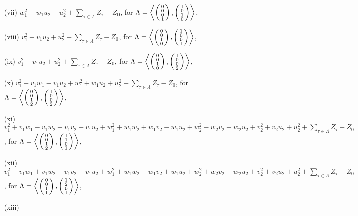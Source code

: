 \begin{prop}
\begin{itemize}
\item[(vii)]
$w_1^2-w_1u_2+u_2^2+\sum_{\tau\in \Lambda} Z_\tau-Z_0$, for $\Lambda= \plan{0\\0\\0\\1}{1\\0\\1\\0}$,
\item[(viii)]
$v_1^2+v_1u_2+u_2^2+\sum_{\tau\in \Lambda} Z_\tau-Z_0$, for $\Lambda= \plan{0\\0\\1\\0}{1\\0\\0\\1}$,
\item[(ix)]
$v_1^2-v_1u_2+u_2^2+\sum_{\tau\in \Lambda} Z_\tau-Z_0$, for $\Lambda= \plan{0\\0\\1\\0}{1\\0\\0\\2}$,
\item[(x)]
$v_1^2+v_1w_1-v_1u_2+w_1^2+w_1u_2+u_2^2+\sum_{\tau\in \Lambda} Z_\tau-Z_0$, for $\Lambda = \plan{0\\0\\1\\2}{1\\0\\0\\2}$,
\item[(xi)]
$v_1^2+v_1w_1-v_1w_2-v_1v_2+v_1u_2+w_1^2+w_1w_2+w_1v_2-w_1u_2+w_2^2-w_2v_2+w_2u_2+v_2^2+v_2u_2+u_2^2+\sum_{\tau\in \Lambda} Z_\tau-Z_0$, for $\Lambda = \plan{0\\0\\1\\2}{1\\1\\0\\1}$,
\item[(xii)]
$v_1^2-v_1w_1+v_1w_2-v_1v_2+v_1u_2+w_1^2+w_1w_2-w_1v_2+w_1u_2+w_2^2+w_2v_2-w_2u_2+v_2^2+v_2u_2+u_2^2+\sum_{\tau\in \Lambda} Z_\tau-Z_0$, for $\Lambda = \plan{0\\0\\1\\1}{1\\2\\0\\1}$,
\item[(xiii)]

\end{itemize}
\end{prop}
